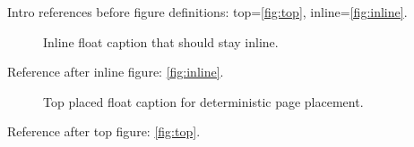 \documentclass{article}
\begin{document}
Intro references before figure definitions: top=\ref{fig:top}, inline=\ref{fig:inline}.
\begin{figure}
\caption{Inline float caption that should stay inline.}
\end{figure}
\label{fig:inline}
Reference after inline figure: \ref{fig:inline}.
\begin{figure}[t]
\caption{Top placed float caption for deterministic page placement.}
\end{figure}
\label{fig:top}
Reference after top figure: \ref{fig:top}.
\end{document}

